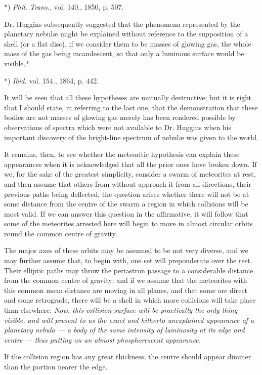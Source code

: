 \documentclass[a4paper, 12pt, oneside, polutonikogreek, english]{article}
\begin{document}
*) \emph{Phil. Trans.}, vol. 140., 1850, p. 507.

Dr. Huggins subsequently suggested that the phenomena represented by the planetary nebulæ might be explained without reference to the supposition of a shell (or a flat disc), if we consider them to be masses of glowing gas, the whole mass of the gas being incandescent, so that only a luminous surface would be visible.*

*) \emph{Ibid.} vol. 154., 1864, p. 442.

It will be seen that all these hypotheses are mutually destructive; but it is right that I should state, in referring to the last one, that the demonstration that these bodies are not masses of glowing gas merely has been rendered possible by observations of spectra which were not available to Dr. Huggins when his important discovery of the bright-line spectrum of nebulæ was given to the world.

It remains, then, to see whether the meteoritic hypothesis can explain these appearances when it is acknowledged that all the prior ones have broken down. If we, for the sake of the greatest simplicity, consider a swarm of meteorites at rest, and then assume that others from without approach it from all directions, their previous paths being deflected, the question arises whether there will not be at some distance from the centre of the swarm a region in which collisions will be most valid. If we can answer this question in the affirmative, it will follow that some of the meteorites arrested here will begin to move in almost circular orbits round the common centre of gravity.

The major axes of these orbits may be assumed to be not very diverse, and we may further assume that, to begin with, one set will preponderate over the rest. Their elliptic paths may throw the periastron passage to a considerable distance from the common centre of gravity; and if we assume that the meteorites with this common mean distance are moving in all planes, and that some are direct and some retrograde, there will be a shell in which more collisions will take place than elsewhere. \emph{Now, this collision surface will be practically the only thing visible, and will present to us the exact and hitherto unexplained appearance of a planetary nebula --- a body of the same intensity of luminosity at its edge and centre --- thus putting on an almost phosphorescent appearance.}

If the collision region has any great thickness, the centre should appear dimmer than the portion nearer the edge.
\end{document}
